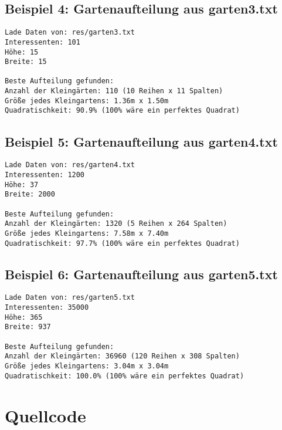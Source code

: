 \documentclass[a4paper,10pt,ngerman]{scrartcl}
\begin{document}
\subsection{Beispiel 4: Gartenaufteilung aus garten3.txt}
\begin{verbatim}
Lade Daten von: res/garten3.txt
Interessenten: 101
Höhe: 15
Breite: 15

Beste Aufteilung gefunden:
Anzahl der Kleingärten: 110 (10 Reihen x 11 Spalten)
Größe jedes Kleingartens: 1.36m x 1.50m
Quadratischkeit: 90.9% (100% wäre ein perfektes Quadrat)
\end{verbatim}

\subsection{Beispiel 5: Gartenaufteilung aus garten4.txt}
\begin{verbatim}
Lade Daten von: res/garten4.txt
Interessenten: 1200
Höhe: 37
Breite: 2000

Beste Aufteilung gefunden:
Anzahl der Kleingärten: 1320 (5 Reihen x 264 Spalten)
Größe jedes Kleingartens: 7.58m x 7.40m
Quadratischkeit: 97.7% (100% wäre ein perfektes Quadrat)
\end{verbatim}


\subsection{Beispiel 6: Gartenaufteilung aus garten5.txt}
\begin{verbatim}
Lade Daten von: res/garten5.txt
Interessenten: 35000
Höhe: 365
Breite: 937

Beste Aufteilung gefunden:
Anzahl der Kleingärten: 36960 (120 Reihen x 308 Spalten)
Größe jedes Kleingartens: 3.04m x 3.04m
Quadratischkeit: 100.0% (100% wäre ein perfektes Quadrat)
\end{verbatim}


\section{Quellcode}
\end{document}
